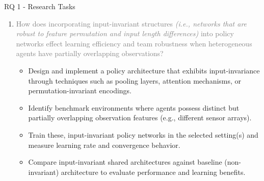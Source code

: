 \begin{frame}{RQ 1 - Research Tasks}
    \begin{enumerate}
        \item[RQ 1] \textcolor{gray}{
            How does incorporating input-invariant structures \emph{(i.e., networks 
            that are robust to feature permutation and input length differences)}
            into policy networks effect learning efficiency and team robustness 
            when heterogeneous agents have partially overlapping observations? } \vspace{1em}
    \begin{itemize}
        \item[RT 1.1] {
            Design and implement a policy architecture that exhibits input-invariance through 
            techniques such as pooling layers, attention mechanisms, or permutation-invariant 
            encodings.}
        \item[RT 1.2] {
            Identify benchmark environments where agents possess distinct but partially 
            overlapping observation features (e.g., different sensor arrays).}
        \item[RT 1.3] {
            Train these, input-invariant policy networks in the selected setting(s) and measure 
            learning rate and convergence behavior.}
        \item[RT 1.4] {
            Compare input-invariant shared architectures against baseline (non-invariant) 
            architecture to evaluate performance and learning benefits.}
    \end{itemize}
    \end{enumerate}
\end{frame}

